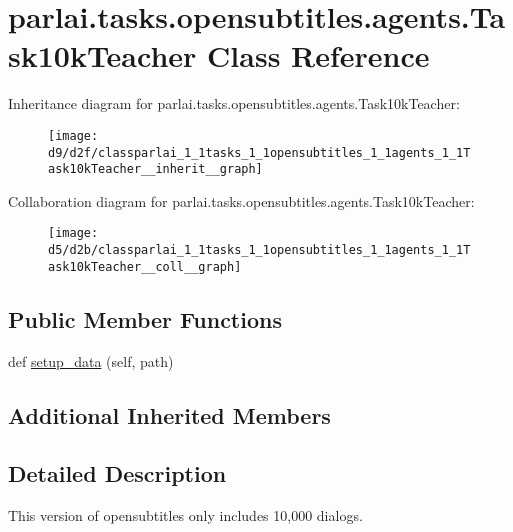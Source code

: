 \hypertarget{classparlai_1_1tasks_1_1opensubtitles_1_1agents_1_1Task10kTeacher}{}\section{parlai.\+tasks.\+opensubtitles.\+agents.\+Task10k\+Teacher Class Reference}
\label{classparlai_1_1tasks_1_1opensubtitles_1_1agents_1_1Task10kTeacher}


Inheritance diagram for parlai.\+tasks.\+opensubtitles.\+agents.\+Task10k\+Teacher\+:
\nopagebreak
\begin{figure}[H]
\begin{center}
\leavevmode
\texttt{[image: d9/d2f/classparlai\_1\_1tasks\_1\_1opensubtitles\_1\_1agents\_1\_1Task10kTeacher\_\_inherit\_\_graph]}
\end{center}
\end{figure}


Collaboration diagram for parlai.\+tasks.\+opensubtitles.\+agents.\+Task10k\+Teacher\+:
\nopagebreak
\begin{figure}[H]
\begin{center}
\leavevmode
\texttt{[image: d5/d2b/classparlai\_1\_1tasks\_1\_1opensubtitles\_1\_1agents\_1\_1Task10kTeacher\_\_coll\_\_graph]}
\end{center}
\end{figure}
\subsection*{Public Member Functions}
\begin{DoxyCompactItemize}
\item 
def \hyperlink{classparlai_1_1tasks_1_1opensubtitles_1_1agents_1_1Task10kTeacher_a2e336eeab89568e9d1bd316e401e9dc1}{setup\+\_\+data} (self, path)
\end{DoxyCompactItemize}
\subsection*{Additional Inherited Members}


\subsection{Detailed Description}
\begin{DoxyVerb}This version of opensubtitles only includes 10,000 dialogs.
\end{DoxyVerb}
 

